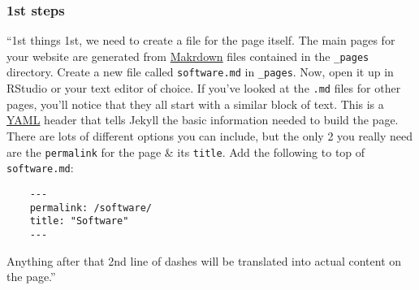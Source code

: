 \documentclass{article}
\numberwithin{equation}{section}
\begin{document}
\subsubsection{1st steps}
``1st things 1st, we need to create a file for the page itself. The main pages for your website are generated from \href{https://en.wikipedia.org/wiki/Markdown}{Makrdown} files contained in the \verb|_pages| directory. Create a new file called \texttt{software.md} in \verb|_pages|. Now, open it up in RStudio or your text editor of choice. If you've looked at the \texttt{.md} files for other pages, you'll notice that they all start with a similar block of text. This is a \href{https://en.wikipedia.org/wiki/YAML}{YAML} header that tells Jekyll the basic information needed to build the page. There are lots of different options you can include, but the only 2 you really need are the \texttt{permalink} for the page \& its \texttt{title}. Add the following to top of \texttt{software.md}:
\begin{verbatim}
	---
	permalink: /software/
	title: "Software"
	---
\end{verbatim}
Anything after that 2nd line of dashes will be translated into actual content on the page.''
\end{document}
